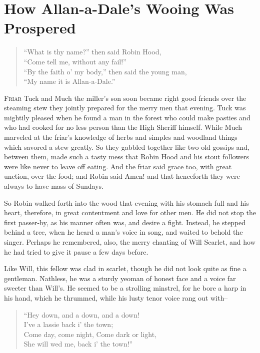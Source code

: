 \chapter{How Allan-a-Dale’s Wooing Was Prospered}

\begin{quote}
“What is thy name?” then said Robin Hood,\\
“Come tell me, without any fail!”\\
“By the faith o’ my body,” then said the young man,\\
“My name it is Allan-a-Dale.”
\end{quote}

\lettrine{F}{riar} Tuck and Much the miller's son soon became right good friends over
the steaming stew they jointly prepared for the merry men that evening.
Tuck was mightily pleased when he found a man in the forest who could
make pasties and who had cooked for no less person than the High Sheriff
himself. While Much marveled at the friar's knowledge of herbs and
simples and woodland things which savored a stew greatly. So they
gabbled together like two old gossips and, between them, made such a
tasty mess that Robin Hood and his stout followers were like never to
leave off eating. And the friar said grace too, with great unction, over
the food; and Robin said Amen! and that henceforth they were always to
have mass of Sundays.

So Robin walked forth into the wood that evening with his stomach full
and his heart, therefore, in great contentment and love for other men.
He did not stop the first passer-by, as his manner often was, and desire
a fight. Instead, he stepped behind a tree, when he heard a man's voice
in song, and waited to behold the singer. Perhaps he remembered, also,
the merry chanting of Will Scarlet, and how he had tried to give it
pause a few days before.

Like Will, this fellow was clad in scarlet, though he did not look quite
as fine a gentleman. Nathless, he was a sturdy yeoman of honest face and
a voice far sweeter than Will's. He seemed to be a strolling minstrel,
for he bore a harp in his hand, which he thrummed, while his lusty tenor
voice rang out with--

\begin{quote}
“Hey down, and a down, and a down!\\
I’ve a lassie back i’ the town;\\
Come day, come night, Come dark or light,\\
She will wed me, back i’ the town!”
\end{quote}

